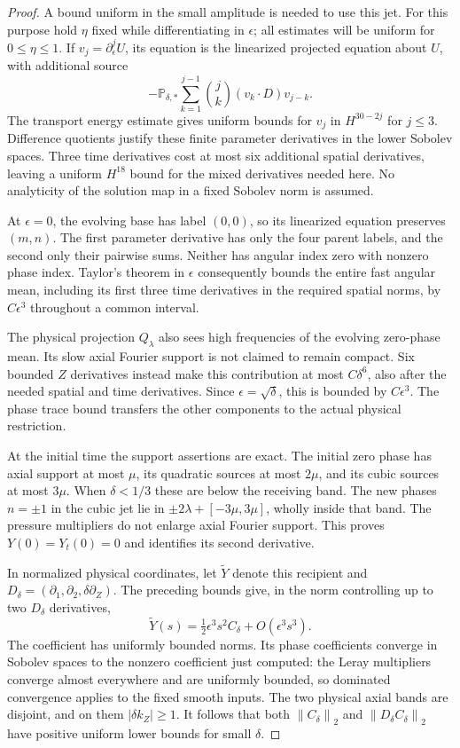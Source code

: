 \documentclass[11pt]{article}
\theoremstyle{remark}
\newcommand{\norm}[1]{\left\lVert#1\right\rVert}
\begin{document}
\begin{proof}
A bound uniform in the small amplitude is needed to use this jet.
For this purpose hold $\eta$ fixed while differentiating in $\epsilon$;
all estimates will be uniform for $0\leq\eta\leq1$.
If $v_j=\partial_\epsilon^j U$, its equation is the linearized
projected equation about $U$, with additional source
\[
 -\mathbb P_{\delta,*}\sum_{k=1}^{j-1}\binom jk
                              (v_k\cdot D)v_{j-k}.
\]
The transport energy estimate gives uniform bounds for $v_j$ in
$H^{30-2j}$ for $j\leq3$. Difference quotients justify these
finite parameter derivatives in the lower Sobolev spaces.
Three time derivatives cost at most six additional spatial derivatives,
leaving a uniform $H^{18}$ bound for the mixed derivatives needed here.
No analyticity of the solution map in a fixed Sobolev norm is assumed.

At $\epsilon=0$, the evolving base has label $(0,0)$, so its linearized
equation preserves $(m,n)$. The first parameter derivative has only the
four parent labels, and the second only their pairwise sums. Neither
has angular index zero with nonzero phase index. Taylor's theorem in
$\epsilon$ consequently bounds the entire fast angular mean, including
its first three time derivatives in the required spatial norms, by
$C\epsilon^3$ throughout a common interval.

The physical projection $Q_\lambda$ also sees high frequencies of the
evolving zero-phase mean. Its slow axial Fourier support is not claimed
to remain compact. Six bounded $Z$ derivatives instead make this
contribution at most $C\delta^6$, also after the needed spatial and
time derivatives. Since $\epsilon=\sqrt\delta$, this is bounded by
$C\epsilon^3$. The phase trace bound transfers the other components
to the actual physical restriction.

At the initial time the support assertions are exact. The initial
zero phase has axial support at most $\mu$, its quadratic sources at
most $2\mu$, and its cubic sources at most $3\mu$. When $\delta<1/3$
these are below the receiving band. The new phases $n=\pm1$ in the
cubic jet lie in $\pm2\lambda+[-3\mu,3\mu]$, wholly inside that band.
The pressure multipliers do not enlarge axial Fourier support.
This proves $Y(0)=Y_t(0)=0$ and identifies its second derivative.

In normalized physical coordinates, let $\widetilde Y$ denote this
recipient and $D_\delta=(\partial_1,\partial_2,\delta\partial_Z)$.
The preceding bounds give, in the norm controlling up to two
$D_\delta$ derivatives,
\begin{equation}\label{eq:mixedTaylor}
 \widetilde Y(s)=\tfrac12\epsilon^3s^2 C_\delta
                                      +O(\epsilon^3s^3).
\end{equation}
The coefficient has uniformly bounded norms. Its phase coefficients
converge in Sobolev spaces to the nonzero coefficient just computed:
the Leray multipliers converge almost everywhere and are uniformly
bounded, so dominated convergence applies to the fixed smooth inputs.
The two physical axial bands are disjoint, and on them
$|\delta k_Z|\geq1$. It follows that both
$\norm{C_\delta}_2$ and $\norm{D_\delta C_\delta}_2$ have positive
uniform lower bounds for small $\delta$.


\end{proof}
\end{document}
